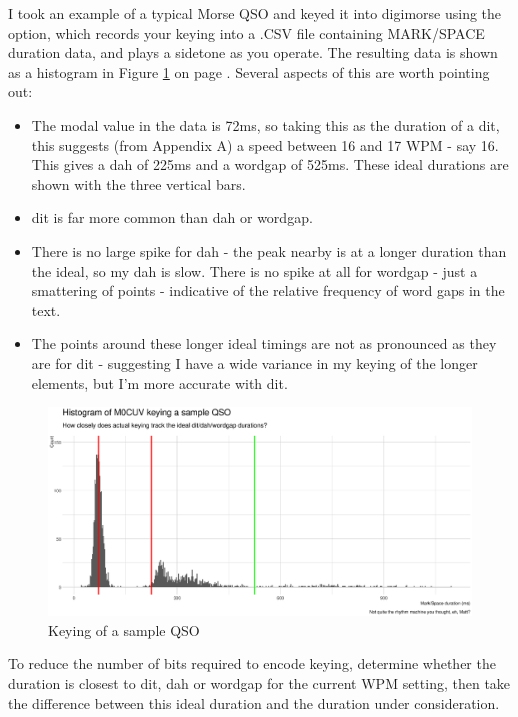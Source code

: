 \documentclass[a4paper]{tufte-handout}
\newcommand{\textls}[2][5]{%
    \begingroup\addfontfeatures{LetterSpace=#1}#2\endgroup
  }
\renewcommand{\smallcapsspacing}[1]{\textls[10]{#1}}
\renewcommand{\textsc}[1]{\smallcapsspacing{\textsmallcaps{#1}}}
\begin{document}
I took an example of a typical Morse QSO\cite{Summers} and keyed it into digimorse using the \textsc{KeyerDiag} option, which records your keying into a .CSV file containing MARK/SPACE duration data, and plays a sidetone as you operate.
The resulting data is shown as a histogram in Figure \ref{fig:sampleqso} on page \pageref{fig:sampleqso}. Several aspects of this are worth pointing out:
\begin{itemize}
    \setlength\itemsep{-0.5em}
    \item The modal value in the data is 72ms, so taking this as the duration of a dit, this suggests (from Appendix A) a speed between 16 and 17 WPM - say 16. This gives a dah of 225ms and a wordgap of 525ms. These ideal durations are shown with the three vertical bars.

	\item dit is far more common than dah or wordgap.
	\item There is no large spike for dah - the peak nearby is at a longer duration than the ideal, so my dah is slow. There is no spike at all for wordgap - just a smattering of points - indicative of the relative frequency of word gaps in the text.
	\item The points around these longer ideal timings are not as pronounced as they are for dit - suggesting I have a wide variance in my keying of the longer elements, but I'm more accurate with dit.
\end{itemize}  

    \begin{figure}[h]
        \includegraphics[width=\linewidth]{sample-qso-m0cuv}
        \caption{Keying of a sample QSO}
        \label{fig:sampleqso}
    \end{figure}

To reduce the number of bits required to encode keying, determine whether the duration is closest to dit, dah or wordgap for the current WPM setting, then take the difference between this ideal duration and the duration under consideration. 
\end{document}
